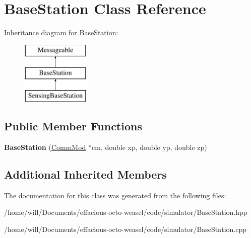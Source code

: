 \hypertarget{class_base_station}{}\section{Base\+Station Class Reference}
\label{class_base_station}
Inheritance diagram for Base\+Station\+:\begin{figure}[H]
\begin{center}
\leavevmode
\includegraphics[height=3.000000cm]{class_base_station}
\end{center}
\end{figure}
\subsection*{Public Member Functions}
\begin{DoxyCompactItemize}
\item 
{\bfseries Base\+Station} (\hyperlink{class_comm_mod}{Comm\+Mod} $\ast$cm, double xp, double yp, double zp)\hypertarget{class_base_station_aa969be6d1673b8ad27229652ab608473}{}\label{class_base_station_aa969be6d1673b8ad27229652ab608473}

\end{DoxyCompactItemize}
\subsection*{Additional Inherited Members}


The documentation for this class was generated from the following files\+:\begin{DoxyCompactItemize}
\item 
/home/will/\+Documents/effacious-\/octo-\/weasel/code/simulator/Base\+Station.\+hpp\item 
/home/will/\+Documents/effacious-\/octo-\/weasel/code/simulator/Base\+Station.\+cpp\end{DoxyCompactItemize}
